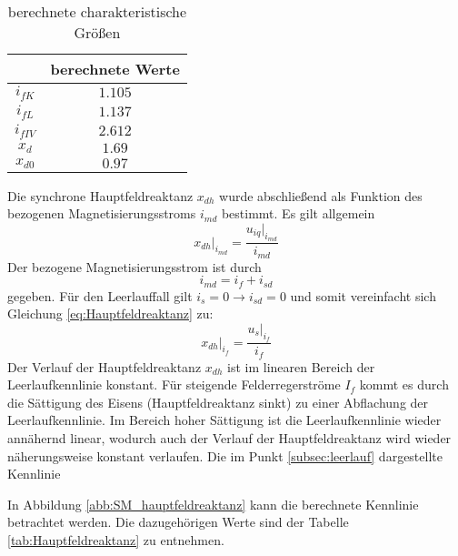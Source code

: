 \begin{table}[!ht]
\centering
\begin{tabular}{|c|c|}
\hline
            & berechnete Werte  \\ \hline
$i_{fK}$    &  $1.105$          \\ \hline
$i_{fL}$    & $1.137$           \\ \hline
$i_{fIV}$   & $2.612$           \\ \hline
$x_d$       & $1.69$            \\ \hline
$x_{d0}$   & $0.97$            \\ \hline
\end{tabular}
\caption{berechnete charakteristische Größen}
\label{tab:Fischer_Hinnen_berechnete_Werte}
\end{table}
\noindent Die synchrone Hauptfeldreaktanz $x_{dh}$ wurde abschließend als Funktion des bezogenen Magnetisierungsstroms $i_{md}$ bestimmt. Es gilt allgemein
\begin{equation*}
    \label{eq:Hauptfeldreaktanz}
    x_{dh} \big|_{i_{md}} = \frac{u_{iq} \big|_{i_{md}}}{i_{md}}
\end{equation*}
Der bezogene Magnetisierungsstrom ist durch 
\begin{equation*}
    i_{md} = i_f + i_{sd}
\end{equation*}
gegeben. Für den Leerlauffall gilt $i_s = 0 \rightarrow i_{sd} = 0$ und somit vereinfacht sich Gleichung \ref{eq:Hauptfeldreaktanz} zu:
\begin{equation*}
        x_{dh} \big|_{i_{f}} = \frac{u_{s} \big|_{i_{f}}}{i_{f}}
\end{equation*}
Der Verlauf der Hauptfeldreaktanz $x_{dh}$ ist im linearen Bereich der Leerlaufkennlinie konstant. Für steigende Felderregerströme $I_f$ kommt es durch die Sättigung des Eisens (Hauptfeldreaktanz sinkt) zu einer Abflachung der Leerlaufkennlinie. Im Bereich hoher Sättigung ist die Leerlaufkennlinie wieder annähernd linear, wodurch auch der Verlauf der Hauptfeldreaktanz wird wieder näherungsweise konstant verlaufen. Die im Punkt \ref{subsec:leerlauf} dargestellte Kennlinie 


In Abbildung \ref{abb:SM_hauptfeldreaktanz} kann die berechnete Kennlinie betrachtet werden. Die dazugehörigen Werte sind der Tabelle \ref{tab:Hauptfeldreaktanz} zu entnehmen.



